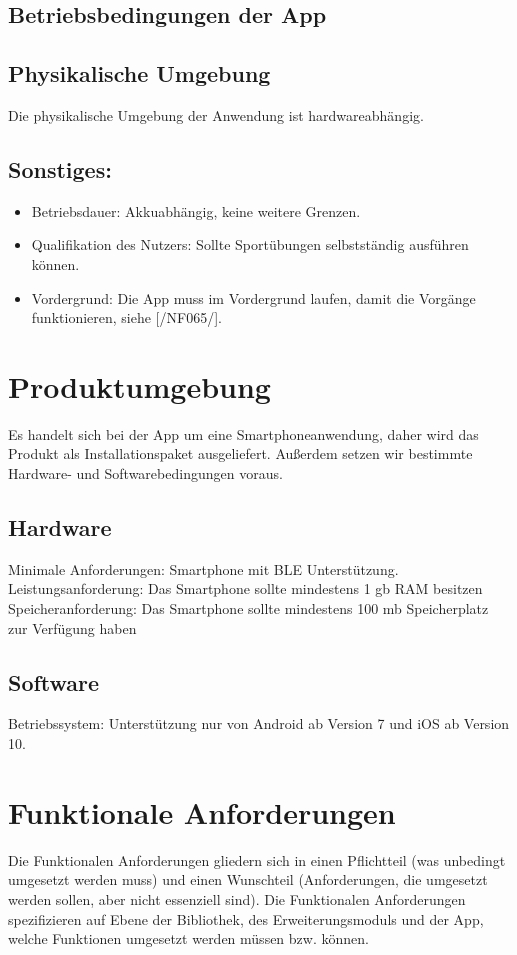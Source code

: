 \documentclass[a4paper,12pt]{article}
\begin{document}
  \subsection{Betriebsbedingungen der App}
    \subsection{Physikalische Umgebung}
      Die physikalische Umgebung der Anwendung ist hardwareabhängig.
    \subsection{Sonstiges:}
    \begin{itemize}
      \item \textsf{Betriebsdauer:} \glqq Akkuabhängig\grqq, keine weitere Grenzen.
      \item \textsf{Qualifikation des Nutzers:} Sollte Sportübungen selbstständig ausführen können.
      \item \textsf{Vordergrund:} Die App muss im Vordergrund laufen, damit die Vorgänge funktionieren, siehe [/NF065/].
    \end{itemize}
      
\section{Produktumgebung}
Es handelt sich bei der App um eine Smartphoneanwendung, daher wird das Produkt als Installationspaket ausgeliefert. Außerdem setzen wir bestimmte Hardware- und Softwarebedingungen voraus.
\subsection{Hardware} 
	\textsf{Minimale Anforderungen:} Smartphone mit \Gls{BLE} Unterstützung.
	\textsf{Leistungsanforderung:} Das Smartphone sollte mindestens 1 gb RAM besitzen
	\textsf{Speicheranforderung:} Das Smartphone sollte mindestens 100 mb Speicherplatz zur Verfügung haben
\subsection{Software} \textsf{Betriebssystem:} Unterstützung nur von Android ab Version 7 und iOS ab Version 10.

\section{Funktionale Anforderungen}
Die Funktionalen Anforderungen gliedern sich in einen Pflichtteil (was unbedingt umgesetzt werden muss) und einen Wunschteil (Anforderungen, die umgesetzt werden sollen, aber nicht essenziell sind). Die Funktionalen Anforderungen spezifizieren auf Ebene der Bibliothek, des Erweiterungsmoduls und der App, welche Funktionen umgesetzt werden müssen bzw. können. 
\end{document}

